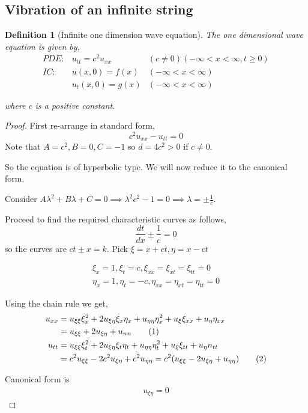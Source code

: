 \documentclass[oneside,11pt,pdftex,final]{book}%
\numberwithin{equation}{section}
\newcommand\numberthis{\addtocounter{equation}{1}\tag{\theequation}}
\newtheorem{definition}[theorem]{Definition}
\numberwithin{section}{chapter}
\numberwithin{equation}{chapter}
\begin{document}
\subsection{Vibration of an infinite string}
\begin{definition}[Infinite one dimension wave equation]\label{1dimwave}
	The one dimensional wave equation is given by,
	\begin{align}
		PDE:& u_{tt}=c^2u_{xx} & (c\neq0 )(-\infty<x<\infty,t\geq 0)\\
		IC:& u(x,0)=f(x) & (-\infty<x<\infty)\\
		&u_t(x,0)=g(x) & (-\infty<x<\infty)
	\end{align}
	
	where $ c $ is a positive constant. 
\end{definition}
\begin{proof}
	First re-arrange in standard form,
	\[ c^2u_{xx}-u_{tt}=0 \]
	Note that $ A=c^2,B=0,C=-1 $ so $ d= 4c^2>0 $ if $ c\neq0  $.
	
	So the equation is of hyperbolic type. We will now reduce it to the canonical form.
	
	Consider $ A\lambda^2+B\lambda+C=0\implies \lambda^2c^2-1=0 \implies \lambda=\pm \frac{1}{c} $.
	
	Proceed to find the required characteristic curves as follows,
	$$ \frac{dt}{dx}\pm\frac{1}{c}=0 $$ so the curves are $ ct\pm x=k $.
	Pick $ \xi=x+ct, \eta=x-ct $
	
	\begin{align*}
		\xi_x=1, \xi_t=c, \xi_{xx}=\xi_{xt}=\xi_{tt}=0\\
		\eta_{x}=1, \eta_t=-c, \eta_{xx}=\eta_{xt}=\eta_{tt}=0
	\end{align*}

	Using the chain rule we get,
	\begin{align*}
		u_{xx}&=u_{\xi \xi}\xi_x^2+2u_{\xi \eta}\xi_x \eta_x+u_{\eta \eta}\eta_x^2+u_\xi \xi_{xx}+u_\eta \eta_{xx}\\
		&=u_{\xi\xi}+2u_{\xi \eta}+u_{nn}\numberthis \label{eq:inf4}\\
		u_{tt}&=u_{\xi \xi}\xi_t^2+2u_{\xi \eta}\xi_t\eta_t+u_{\eta \eta}\eta_t^2+u_\xi \xi_{tt}+u_\eta n_{tt}\\
		&=c^2u_{\xi \xi}-2c^2u_{\xi \eta}+c^2u_{\eta \eta}=c^2(u_{\xi \xi}-2u_{\xi \eta}+u_{\eta \eta}) \numberthis \label{eq:inf5}
	\end{align*}
	
	
	Canonical form is
	\begin{align}\label{eq:inf6}
		u_{\xi \eta}=0
	\end{align}
	

\end{proof}
\end{document}
